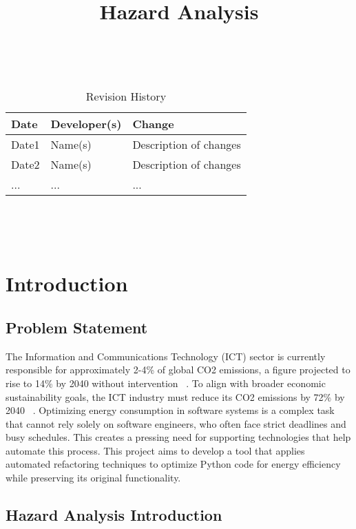 \documentclass{article}
\title{Hazard Analysis\\\progname}
\author{\authname}
\date{}
\begin{document}
\maketitle
\thispagestyle{empty}

~\newpage


\begin{table}[hp]
\caption{Revision History} \label{TblRevisionHistory}
\begin{tabularx}{\textwidth}{llX}
\toprule
\textbf{Date} & \textbf{Developer(s)} & \textbf{Change}\\
\midrule
Date1 & Name(s) & Description of changes\\
Date2 & Name(s) & Description of changes\\
... & ... & ...\\
\bottomrule
\end{tabularx}
\end{table}

~\newpage

\tableofcontents

~\newpage




\section{Introduction}

\subsection{Problem Statement}
The Information and Communications Technology (ICT) sector is currently responsible
for approximately 2-4\% of global CO2 emissions, a figure projected to rise to 14\% 
by 2040 without intervention ~\citep{BelkhirAndElmeligi2018}. To align with broader 
economic sustainability goals, the ICT industry must reduce its CO2 emissions by 72\% 
by 2040 ~\citep{FreitagAndBernersLee2021}. Optimizing energy consumption in software 
systems is a complex task that cannot rely solely on software engineers, who often 
face strict deadlines and busy schedules. This creates a pressing need for supporting 
technologies that help automate this process. This project aims to develop a tool that 
applies automated refactoring techniques to optimize Python code for energy efficiency 
while preserving its original functionality. 

\subsection{Hazard Analysis Introduction}
\end{document}

